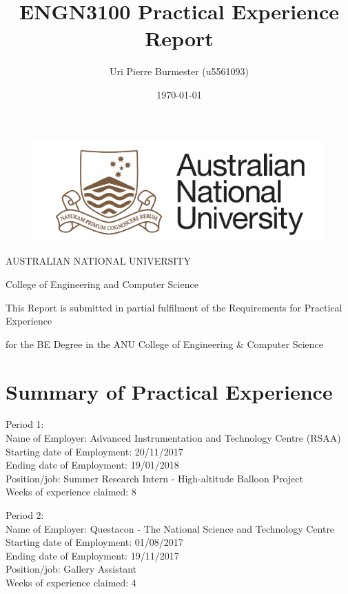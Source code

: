 \documentclass[11pt]{article}
\title{ENGN3100 Practical Experience Report}
\author{Uri Pierre Burmester (u5561093)}
\date{\today}
\begin{document}
\begin{figure} \centering
  \includegraphics[width=0.5\linewidth]{ANU.png}
\end{figure}

\maketitle

\centerline{AUSTRALIAN NATIONAL UNIVERSITY}  
\centerline{College of Engineering and Computer Science} 

\bigskip

\centerline{This Report is submitted in partial fulfilment of the Requirements for Practical Experience}
\centerline{ for the BE Degree in the ANU College of Engineering \& Computer Science}

\newpage

\tableofcontents

\newpage

\section{Summary of Practical Experience}

Period 1: \\
Name of Employer: Advanced Instrumentation and Technology Centre (RSAA) \\
Starting date of Employment: 20/11/2017 \\
Ending date of Employment: 19/01/2018 \\
Position/job: Summer Research Intern - High-altitude Balloon Project \\
Weeks of experience claimed: 8 \\

\medskip

Period 2: \\
Name of Employer: Questacon - The National Science and Technology Centre \\
Starting date of Employment: 01/08/2017 \\
Ending date of Employment: 19/11/2017 \\
Position/job: Gallery Assistant \\
Weeks of experience claimed: 4 \\
\end{document}
